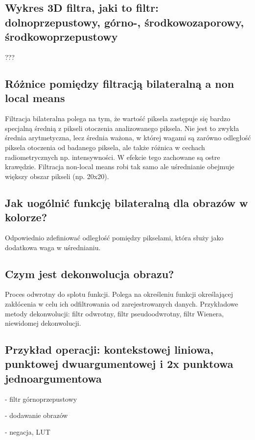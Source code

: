\documentclass[a4paper, 12pt, titlepage]{article}
\begin{document}
\subsection{Wykres 3D filtra, jaki to filtr: dolnoprzepustowy, górno-, środkowozaporowy, środkowoprzepustowy}
???

\subsection{Różnice pomiędzy filtracją bilateralną a non local means}
Filtracja bilateralna polega na tym, że wartość piksela zastępuje się bardzo specjalną średnią z pikseli otoczenia analizowanego piksela. Nie jest to zwykła średnia arytmetyczna, lecz średnia ważona, w której wagami są zarówno odległość piksela otoczenia od badanego piksela, ale także różnica w cechach radiometrycznych np. intensywności. W efekcie tego zachowane są ostre krawędzie. 
Filtracja non-local means robi tak samo ale uśrednianie obejmuje większy obszar pikseli (np. 20x20).

\subsection{Jak uogólnić funkcję bilateralną dla obrazów w kolorze?}
Odpowiednio zdefiniować odległość pomiędzy pikselami, która służy jako dodatkowa waga w uśrednianiu. 

\subsection{Czym jest dekonwolucja obrazu?}
Proces odwrotny do splotu funkcji. Polega na określeniu funkcji określającej zakłócenia w celu ich
odfiltrowania od zarejestrowanych danych. Przykładowe metody dekonwolucji: filtr odwrotny, filtr pseudoodwrotny, filtr Wienera, niewidomej dekonwolucji.

\subsection{Przykład operacji: kontekstowej liniowa, punktowej dwuargumentowej i 2x punktowa jednoargumentowa}
\begin{description}[noitemsep]
	\item[Kontekstowa liniowa] - filtr górnoprzepustowy
	\item[Punktowa dwuargumentowa] - dodawanie obrazów
	\item[Punktowe jednoargumentowe] - negacja, LUT

\end{description}
\end{document}
